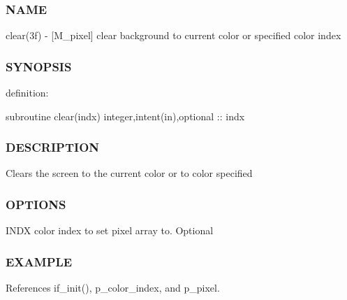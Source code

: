 \subsubsection*{N\+A\+ME}

clear(3f) -\/ \mbox{[}M\+\_\+pixel\mbox{]} clear background to current color or specified color index 

\subsubsection*{S\+Y\+N\+O\+P\+S\+IS}

definition\+:

subroutine clear(indx) integer,intent(in),optional \+:\+: indx

\subsubsection*{D\+E\+S\+C\+R\+I\+P\+T\+I\+ON}

Clears the screen to the current color or to color specified

\subsubsection*{O\+P\+T\+I\+O\+NS}

I\+N\+DX color index to set pixel array to. Optional

\subsubsection*{E\+X\+A\+M\+P\+LE}

References if\+\_\+init(), p\+\_\+color\+\_\+index, and p\+\_\+pixel.

